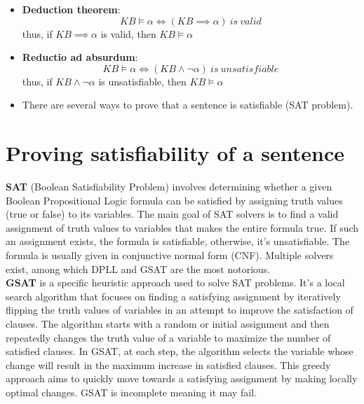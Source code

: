 \documentclass{article}
\begin{document}
\begin{itemize}
    \item \textbf{Deduction theorem}:
    \begin{equation*}
        KB \models \alpha \iff (KB \implies \alpha)\ is\ valid
    \end{equation*}
    thus, if $KB \implies \alpha$ is valid, then $KB \models \alpha$
    \item \textbf{Reductio ad absurdum}:
    \begin{equation*}
        KB \models \alpha \iff (KB \land \neg \alpha)\ is\ unsatisfiable
    \end{equation*}
    thus, if $KB \land \neg \alpha$ is unsatisfiable, then $KB \models \alpha$
    \item There are several ways to prove that a sentence is satisfiable (SAT problem).
\end{itemize}

\section{Proving satisfiability of a sentence}

\textbf{SAT} (Boolean Satisfiability Problem) involves determining whether a given Boolean Propositional Logic formula can be satisfied by assigning truth values (true or false) to its variables. The main goal of SAT solvers is to find a valid assignment of truth values to variables that makes the entire formula true. If such an assignment exists, the formula is satisfiable, otherwise, it's unsatisfiable. The formula is usually given in conjunctive normal form (CNF). Multiple solvers exist, among which DPLL and GSAT are the most notorious. \\

\textbf{GSAT} is a specific heuristic approach used to solve SAT problems. It's a local search algorithm that focuses on finding a satisfying assignment by iteratively flipping the truth values of variables in an attempt to improve the satisfaction of clauses. The algorithm starts with a random or initial assignment and then repeatedly changes the truth value of a variable to maximize the number of satisfied clauses. In GSAT, at each step, the algorithm selects the variable whose change will result in the maximum increase in satisfied clauses. This greedy approach aims to quickly move towards a satisfying assignment by making locally optimal changes. GSAT is incomplete meaning it may fail.

\end{document}
